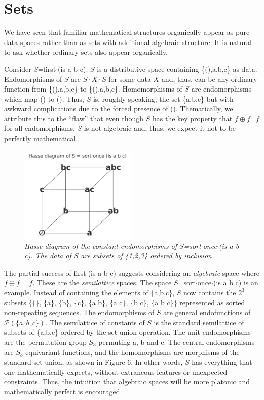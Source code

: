 \documentclass[11pt]{article}
\begin{document}
\section{Sets}

    We have seen that familiar mathematical structures organically appear as pure data spaces rather than as sets with additional algebraic structure.  
It is natural to ask whether ordinary sets also appear organically.  

     Consider $S$=first$\cdot$(is a b c).  $S$ is a distributive space containing \{(),a,b,c\} as data.  Endomorphisms of $S$ are  
$S\cdot X\cdot S$ for some data $X$ and, thus, can be any ordinary function from \{(),a,b,c\} to \{(),a,b,c\}.  Homomorphisms of $S$ 
are endomorphisms which map () to ().  Thus, $S$ is, roughly speaking, the set \{a,b,c\} but with awkward complications due 
to the forced presence of ().  Thematically, we attribute this to the ``flaw'' that even though $S$ has the key property 
that $f\oplus f$=$f$ for all endomorphisms, $S$ is not algebraic and, thus, we expect it not to be perfectly mathematical.  

\begin{figure}[h]
\centering
\includegraphics[width=0.5\textwidth]{hasse.png}
\caption{{\it Hasse diagram of the constant endomorphisms of $S$=sort$\cdot$once$\cdot$(is a b c).  The data of $S$ are subsets 
of \{1,2,3\} ordered by inclusion.}}
\end{figure}

     The partial success of first$\cdot$(is a b c) suggests considering an {\it algebraic} space where $f\oplus f=f$.  
These are the {\it semilattice} spaces.  The space $S$=sort$\cdot$once$\cdot$(is a b c) is an example.  
Instead of containing the elements of \{a,b,c\}, $S$ now contains the $2^3$ subsets \{\{\}, \{a\}, \{b\}, \{c\}, \{a b\}, \{a c\}, \{b c\}, \{a b c\}\} 
represented as sorted non-repeating sequences.  The endomorphisms of $S$ are general endofunctions of ${\mathcal P}(\{a,b,c\})$.  The semilattice of 
constants of $S$ is the standard semilattice of subsets of \{a,b,c\} ordered by the set union operation.  
The unit endomorphisms are the permutation group $S_3$ permuting a, b and c.  The central endomorphisms are $S_3$-equivariant functions, and the homomorphisms 
are morphisms of the standard set union, as shown in Figure 6.  In other words, $S$ has everything that one mathematically expects, without extraneous features or 
unexpected constraints.  Thus, the intuition that algebraic spaces will be more platonic and mathematically perfect is encouraged.  
\end{document}
